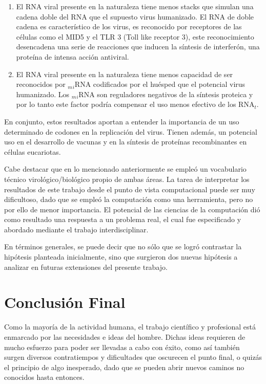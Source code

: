 \begin{itemize}
    \begin{enumerate}
    \item El RNA viral presente en la naturaleza tiene menos stacks que simulan una cadena doble del RNA que el supuesto virus humanizado. El RNA de doble cadena es característico de los virus, es reconocido por receptores de las células como el MID5 y el TLR 3  (Toll like receptor 3), este reconocimiento desencadena una serie de reacciones que inducen la síntesis de interferón, una proteína de intensa acción antiviral.

    \item El RNA viral presente en la naturaleza tiene menos capacidad de ser reconocidos por $_m$$_i$RNA codificados por el huésped que el potencial virus humanizado. Los $_m$$_i$RNA son reguladores negativos de la síntesis proteica y por lo tanto este factor podría compensar el uso menos efectivo de los RNA$_t$.
    \end{enumerate}

\end{itemize}

\par En conjunto, estos resultados aportan a entender la importancia de un uso determinado de codones en la replicación del virus. Tienen además, un potencial uso en el desarrollo de vacunas y en la síntesis de proteínas recombinantes en células eucariotas. 


\par Cabe destacar que en lo mencionado anteriormente se empleó un vocabulario técnico virológico/biológico propio de ambas áreas. La tarea de interpretar los resultados de este trabajo desde el punto de vista computacional puede ser muy dificultoso, dado que se empleó la computación como una herramienta, pero no por ello de menor importancia. El potencial de las ciencias de la computación dió como resultado una respuesta a un problema real, el cual fue especificado y abordado mediante el trabajo interdisciplinar.  

\par En términos generales, se puede decir que no sólo que se logró contrastar la hipótesis planteada inicialmente, sino que surgieron dos nuevas hipótesis a analizar en futuras extensiones del presente trabajo.

\section{Conclusión Final}
\par Como la mayoría de la actividad humana, el trabajo científico y profesional está enmarcado por las necesidades e ideas del hombre. Dichas ideas requieren de mucho esfuerzo para poder ser llevadas a cabo con éxito, como así también surgen diversos contratiempos y dificultades que oscurecen el punto final, o quizás el principio de algo inesperado, dado que se pueden abrir nuevos caminos no conocidos hasta entonces.

